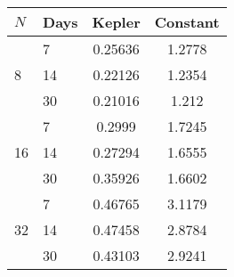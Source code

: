 \begin{tabular}{l|lcc}
\hline
$N$ & Days & Kepler & Constant \\
\hline
\multirow{3}{*}{8} & 7 & 0.25636 & 1.2778 \\ 
&14 & 0.22126 & 1.2354 \\ 
&30 & 0.21016 & 1.212 \\ \hline
\multirow{3}{*}{16}& 7 & 0.2999 & 1.7245 \\ 
&14 & 0.27294 & 1.6555 \\ 
&30 & 0.35926 & 1.6602 \\ \hline
\multirow{3}{*}{32}& 7 & 0.46765 & 3.1179 \\ 
&14 & 0.47458 & 2.8784 \\ 
&30 & 0.43103 & 2.9241 \\ \hline
\end{tabular}